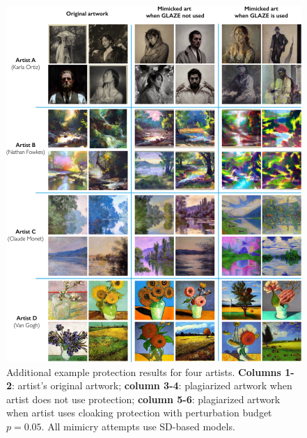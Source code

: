 \begin{figure}
  \centering
  \includegraphics[width=1.0\linewidth]{plots/appendix/full-results.pdf}
  \caption{Additional example \system{} protection results for four artists. {\bf Columns 1-2}: artist's original artwork; {\bf column 3-4}: plagiarized artwork when artist does not use protection; {\bf column 5-6}: plagiarized artwork when artist uses cloaking protection with perturbation budget $p=0.05$. All mimicry attempts use SD-based models. }
  \label{fig:additional-pictures}
\end{figure}
